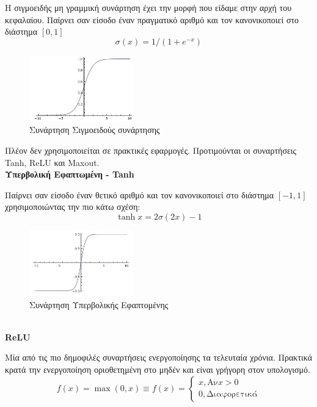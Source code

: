 Η σιγμοειδής μη γραμμική συνάρτηση έχει την μορφή που είδαμε στην αρχή του κεφαλαίου.
Παίρνει σαν είσοδο έναν πραγματικό αριθμό και τον κανονικοποιεί στο διάστημα $[0, 1]$
\[
  \sigma(x) = 1 / (1 + e^{-x})
\]

\begin{figure}[!ht]
  \centering
  \includegraphics[width=0.4\textwidth]{./images/chapter3/sigmoid.jpg}
  \caption[Συνάρτηση Σιγμοειδούς συνάρτησης]{Συνάρτηση Σιγμοειδούς συνάρτησης}
  \label{fig:sigmoid}
\end{figure}

Πλέον δεν χρησιμοποιείται σε πρακτικές εφαρμογές. Προτιμούνται οι συναρτήσεις
Tanh, ReLU και Maxout.
\\

\textbf{Υπερβολική Εφαπτωμένη - Tanh}

Παίρνει σαν είσοδο έναν θετικό αριθμό και τον κανονικοποιεί στο διάστημα $[-1, 1]$
χρησιμοποιώντας την πιο κάτω σχέση:
\[
  \tanh{x} = 2\sigma(2x) - 1
\]

\begin{figure}[!ht]
  \centering
  \includegraphics[width=0.4\textwidth]{./images/chapter3/tanh.jpg}
  \caption[Συνάρτηση Υπερβολικής Εφαπτωμένης]{Συνάρτηση Υπερβολικής Εφαπτομένης}
  \label{fig:tanh}
\end{figure}
\\

\textbf{ReLU}

Μία από τις πιο δημοφιλές συναρτήσεις ενεργοποίησης τα τελευταία χρόνια.
Πρακτικά κρατά την ενεργοποίηση οριοθετημένη στο μηδέν και είναι
γρήγορη στον υπολογισμό.
\[
  f(x) = \max(0, x) \equiv f(x) =
  \begin{cases}
    x, \text{Αν} x > 0 \\
    0, \text{Διαφορετικά}
  \end{cases}
\]

